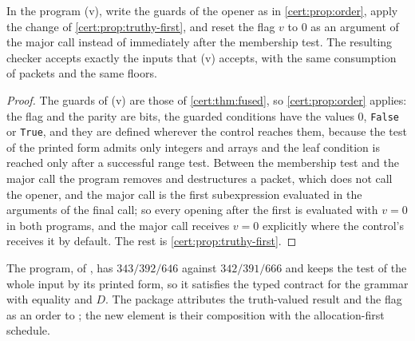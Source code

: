 \begin{proposition}\label{cert:prop:native-first}
In the program (v), write the guards of the opener as in
\cref{cert:prop:order}, apply the change of \cref{cert:prop:truthy-first},
and reset the flag $v$ to $0$ as an argument of the major call instead of
immediately after the membership test. The resulting checker accepts exactly
the inputs that (v) accepts, with the same consumption of packets and the
same floors.
\end{proposition}
\begin{proof}
The guards of (v) are those of \cref{cert:thm:fused}, so
\cref{cert:prop:order} applies: the flag and the parity are bits, the guarded
conditions have the values $0$, \texttt{False} or \texttt{True}, and they are
defined wherever the control reaches them, because the test of the printed
form admits only integers and arrays and the leaf condition is reached only
after a successful range test. Between the membership test and the major call
the program removes and destructures a packet, which does not call the opener,
and the major call is the first subexpression evaluated in the arguments of
the final call; so every opening after the first is evaluated with $v=0$ in
both programs, and the major call receives $v=0$ explicitly where the
control's receives it by default. The rest is
\cref{cert:prop:truthy-first}.
\end{proof}

The program, of , has $343/392/646$ against
$342/391/666$ and keeps the test of the whole input by its printed form, so
it satisfies the typed contract for the grammar with equality and $D$. The
package attributes the truth-valued result and the flag as an order to
; the new element is their composition with the
allocation-first schedule.

